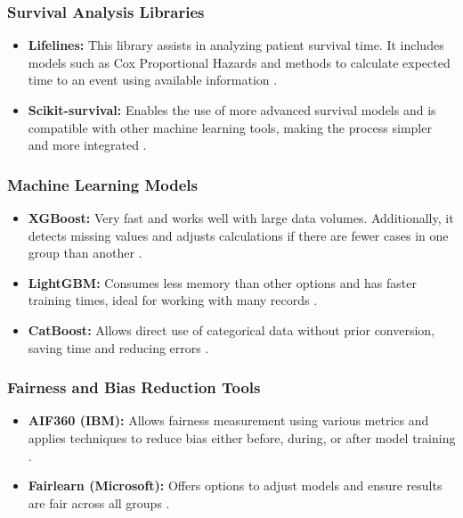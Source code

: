 \subsubsection{Survival Analysis Libraries}

\begin{itemize}
    \item \textbf{Lifelines:} This library assists in analyzing patient survival time. It includes models such as Cox Proportional Hazards and methods to calculate expected time to an event using available information \cite{lifelines_docs}.
    
    \item \textbf{Scikit-survival:} Enables the use of more advanced survival models and is compatible with other machine learning tools, making the process simpler and more integrated \cite{scikit_survival_intro}.
\end{itemize}

\subsubsection{Machine Learning Models}

\begin{itemize}
    \item \textbf{XGBoost:} Very fast and works well with large data volumes. Additionally, it detects missing values and adjusts calculations if there are fewer cases in one group than another \cite{neptune_boosting}.
    
    \item \textbf{LightGBM:} Consumes less memory than other options and has faster training times, ideal for working with many records \cite{cienciadedatos_forecast}.
    
    \item \textbf{CatBoost:} Allows direct use of categorical data without prior conversion, saving time and reducing errors \cite{geeksforgeeks_boosting}.
\end{itemize}

\subsubsection{Fairness and Bias Reduction Tools}

\begin{itemize}
    \item \textbf{AIF360 (IBM):} Allows fairness measurement using various metrics and applies techniques to reduce bias either before, during, or after model training \cite{aif360_github}.
    
    \item \textbf{Fairlearn (Microsoft):} Offers options to adjust models and ensure results are fair across all groups \cite{fairlearn_org}.
\end{itemize}

